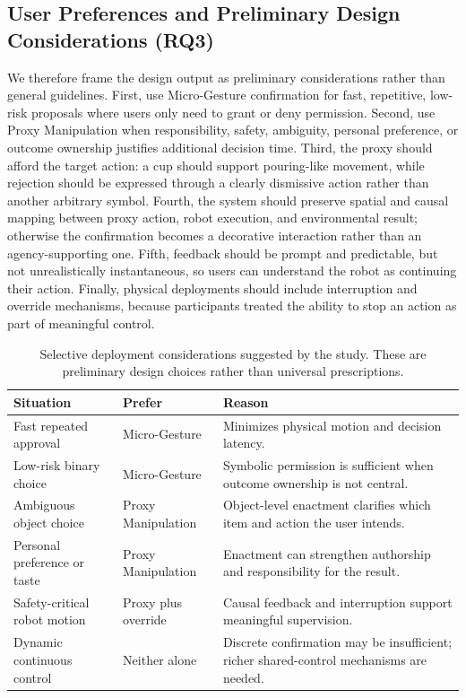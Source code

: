 \documentclass[sigconf,review,anonymous]{acmart}
\begin{document}
\subsection{User Preferences and Preliminary Design Considerations (RQ3)}
We therefore frame the design output as preliminary considerations rather than general guidelines. First, use Micro-Gesture confirmation for fast, repetitive, low-risk proposals where users only need to grant or deny permission. Second, use Proxy Manipulation when responsibility, safety, ambiguity, personal preference, or outcome ownership justifies additional decision time. Third, the proxy should afford the target action: a cup should support pouring-like movement, while rejection should be expressed through a clearly dismissive action rather than another arbitrary symbol. Fourth, the system should preserve spatial and causal mapping between proxy action, robot execution, and environmental result; otherwise the confirmation becomes a decorative interaction rather than an agency-supporting one. Fifth, feedback should be prompt and predictable, but not unrealistically instantaneous, so users can understand the robot as continuing their action. Finally, physical deployments should include interruption and override mechanisms, because participants treated the ability to stop an action as part of meaningful control.

\begin{table}[tb]
\centering
\caption{Selective deployment considerations suggested by the study. These are preliminary design choices rather than universal prescriptions.}
\label{tab:deployment}
\scriptsize
\setlength{\tabcolsep}{3pt}
\begin{tabular}{@{}p{}p{}p{}@{}}
\toprule
\textbf{Situation} & \textbf{Prefer} & \textbf{Reason} \\
\midrule
Fast repeated approval & Micro-Gesture & Minimizes physical motion and decision latency. \\
Low-risk binary choice & Micro-Gesture & Symbolic permission is sufficient when outcome ownership is not central. \\
Ambiguous object choice & Proxy Manipulation & Object-level enactment clarifies which item and action the user intends. \\
Personal preference or taste & Proxy Manipulation & Enactment can strengthen authorship and responsibility for the result. \\
Safety-critical robot motion & Proxy plus override & Causal feedback and interruption support meaningful supervision. \\
Dynamic continuous control & Neither alone & Discrete confirmation may be insufficient; richer shared-control mechanisms are needed. \\
\bottomrule
\end{tabular}
\end{table}
\end{document}
